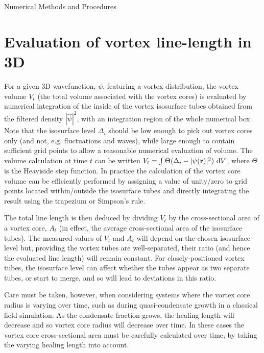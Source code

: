 \begin{chapter}{\label{cha:numerics}Numerical Methods and Procedures}
  	
\section{\label{section:linelength} Evaluation of vortex line-length in 3D}
For a given 3D wavefunction, $\psi$, featuring a vortex distribution, the vortex volume $V_t$ (the total volume associated with the vortex cores) is evaluated by numerical integration of the inside of the vortex isosurface tubes obtained from the filtered density $|\hat \psi|^2$, with an integration region of the whole numerical box.  Note that the isosurface level $\Delta_i$ should be low enough to pick out vortex cores only (and not, e.g. fluctuations and waves), while large enough to contain sufficient grid points to allow a reasonable numerical evaluation of volume. The volume calculation at time $t$ can be written $V_t = \int \Theta(\Delta_i - |\psi({\bf r})|^2)~{\rm d}V$, where $\Theta$ is the Heaviside step function. In practice the calculation of the vortex core volume can be efficiently performed by assigning a value of unity/zero to grid points located within/outside the isosurface tubes and directly integrating the result using the trapezium or Simpson's rule.

The total line length is then deduced by dividing $V_t$ by the cross-sectional area of a vortex core, $A_t$ (in effect, the average cross-sectional area of the isosurface tubes). The measured values of $V_t$ and $A_t$ will depend on the chosen isosurface level but, providing the vortex tubes are well-separated, their ratio (and hence the evaluated line length) will remain constant.  For closely-positioned vortex tubes, the isosurface level can affect whether the tubes appear as two separate tubes, or start to merge, and so will lead to deviations in this ratio.

Care must be taken, however, when considering systems where the vortex core radius is varying over time, such as during quasi-condensate growth in a classical field simulation. As the condensate fraction grows, the healing length will decrease and so vortex core radius will decrease over time. In these cases the vortex core cross-sectional area must be carefully calculated over time, by taking the varying healing length into account.
\end{chapter}
